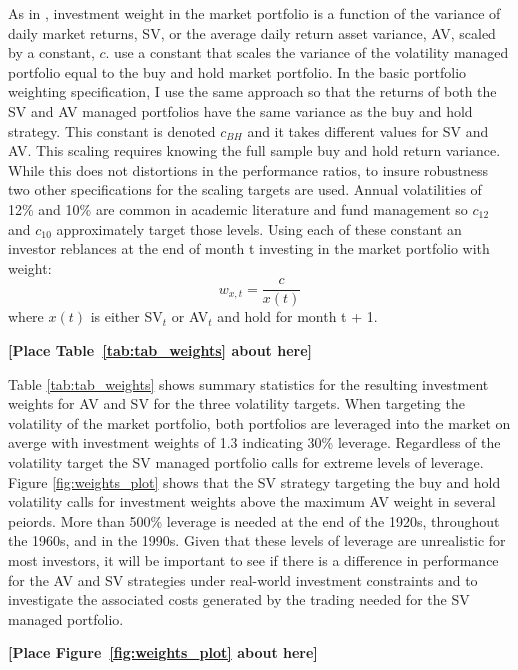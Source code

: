 As in \citet{moreira_volatility-managed_2017}, investment weight in the market portfolio is a function of the variance of daily market returns, SV, or the average daily return asset variance, AV, scaled by a constant, $c$. \citet{moreira_volatility-managed_2017} use a constant that scales the variance of the volatility managed portfolio equal to the buy and hold market portfolio. In the basic portfolio weighting specification, I use the same approach so that the returns of both the SV and AV managed portfolios have the same variance as the buy and hold strategy. This constant is denoted $c_{BH}$ and it takes different values for SV and AV. This scaling requires knowing the full sample buy and hold return variance. While this does not distortions in the performance ratios, to insure robustness two other specifications for the scaling targets are used. Annual volatilities of 12\% and 10\% are common in academic literature and fund management so $c_{12}$ and $c_{10}$ approximately target those levels. \citet{barroso_momentum_2015,morrison_guarantees_nodate,verma_volatility-targeting_2018,fleming_economic_nodate,hocquard_constant-volatility_2013} Using each of these constant an investor reblances at the end of month t investing in the market portfolio with weight:
\begin{equation}
	w_{x,t} = \frac{c}{x(t)}
\end{equation} where $x(t)$ is either SV$_{t}$ or AV$_{t}$ and hold for month t + 1. 

\bigskip
\centerline{\bf [Place Table~\ref{tab:tab_weights} about here]}
\bigskip
Table \ref{tab:tab_weights} shows summary statistics for the resulting investment weights for AV and SV for the three volatility targets. When targeting the volatility of the market portfolio, both portfolios are leveraged into the market on averge with investment weights of 1.3 indicating 30\% leverage. Regardless of the volatility target the SV managed portfolio calls for extreme levels of leverage. Figure \ref{fig:weights_plot} shows that the SV strategy targeting the buy and hold volatility calls for investment weights above the maximum AV weight in several peiords. More than 500\% leverage is needed at the end of the 1920s, throughout the 1960s, and in the 1990s. Given that these levels of leverage are unrealistic for most investors, it will be important to see if there is a difference in performance for the AV and SV strategies under real-world investment constraints and to investigate the associated costs generated by the trading needed for the SV managed portfolio.
\bigskip
\centerline{\bf [Place Figure~\ref{fig:weights_plot} about here]}
\bigskip
